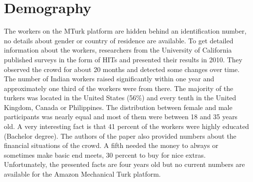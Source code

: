 \section{Demography}
The workers on the MTurk platform are hidden behind an identification number, no details about gender or country of residence are available. To get detailed information about the workers, researchers from the University of California published surveys in the form of HITs\cite{ross} and presented their results in 2010. They observed the crowd for about 20 months and detected some changes over time. The number of Indian workers raised significantly within one year and approximately one third of the workers were from there. The majority of the turkers was located in the United States (56\%) and every tenth in the United Kingdom, Canada or Philippines. The distribution between female and male participants was nearly equal and most of them were between 18 and 35 years old. A very interesting fact is that 41 percent of the workers were highly educated (Bachelor degree). The authors of the paper also provided numbers about the financial situations of the crowd.  A fifth needed the money to always or sometimes make basic end meets, 30 percent to buy for nice extras. 
Unfortunately, the presented facts are four years old but no current numbers are available for the Amazon Mechanical Turk platform.

